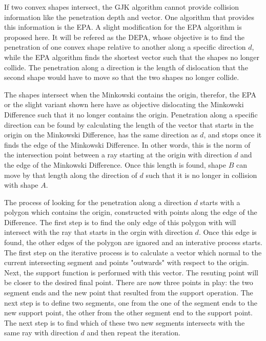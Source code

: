 \par If two convex shapes intersect, the \ac{GJK} algorithm cannot provide collision information like the penetration depth and vector. One algorithm that provides this information is the \ac{EPA}.
A slight modification for the \ac{EPA} algorithm is proposed here. It will be refered as the \ac{DEPA}, whose objective is to find the penetration of one convex shape relative to another along a specific direction $d$, while the \ac{EPA} algorithm finds the shortest vector such that the shapes no longer collide. The penetration along a direction is the length of dislocation that the second shape would have to move so that the two shapes no longer collide. 
\par The shapes intersect when the Minkowski contains the origin, therefor, the \ac{EPA} or the slight variant shown here have as objective dislocating the Minkowski Difference such that it no longer contains the origin. Penetration along a specific direction can be found by calculating the length of the vector that starts in the origin on the Minkowski Difference, has the same direction as $d$, and stops once it finds the edge of the Minkowski Difference. In other words, this is the norm of the intersection point between a ray starting at the origin with direction $d$ and the edge of the Minkowski Difference. Once this length is found, shape $B$ can move by that length along the direction of $d$ such that it is no longer in collision with shape $A$.
\par The process of looking for the penetration along a direction $d$ starts with a polygon which contains the origin, constructed with points along the edge of the Difference. The first step is to find the only edge of this polygon with will intersect with the ray that starts in the orgin with direction $d$. Once this edge is found, the other edges of the polygon are ignored and an interative process starts. The first step on the iterative process is to calculate a vector which normal to the current intersecting segment and points "outwards" with respect to the origin. Next, the support function is performed with this vector. The resuting point will be closer to the desired final point. There are now three points in play: the two segment ends and the new point that resulted from the support operation. The next step is to define two segments, one from the one of the segment ends to the new support point, the other from the other segment end to the support point. The next step is to find which of these two new segments intersects with the same ray with direction $d$ and then repeat the iteration. 



